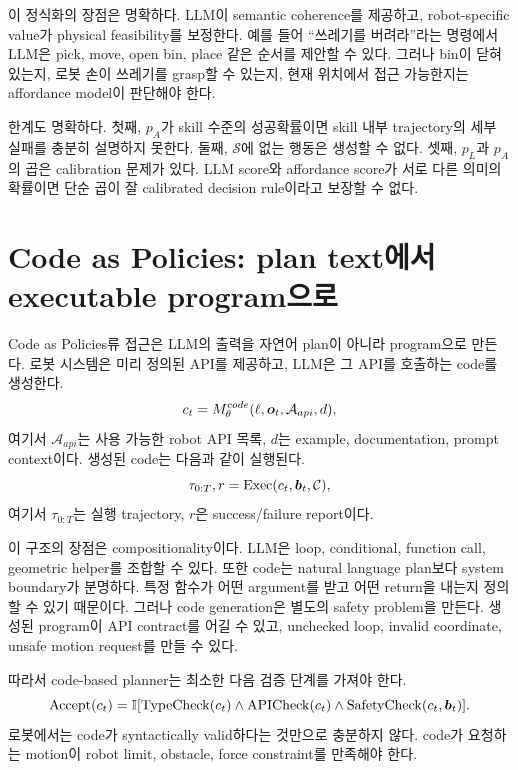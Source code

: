 이 정식화의 장점은 명확하다. LLM이 semantic coherence를 제공하고, robot-specific value가 physical feasibility를 보정한다. 예를 들어 ``쓰레기를 버려라''라는 명령에서 LLM은 pick, move, open bin, place 같은 순서를 제안할 수 있다. 그러나 bin이 닫혀 있는지, 로봇 손이 쓰레기를 grasp할 수 있는지, 현재 위치에서 접근 가능한지는 affordance model이 판단해야 한다.

한계도 명확하다. 첫째, $p_A$가 skill 수준의 성공확률이면 skill 내부 trajectory의 세부 실패를 충분히 설명하지 못한다. 둘째, $\mathcal{S}$에 없는 행동은 생성할 수 없다. 셋째, $p_L$과 $p_A$의 곱은 calibration 문제가 있다. LLM score와 affordance score가 서로 다른 의미의 확률이면 단순 곱이 잘 calibrated decision rule이라고 보장할 수 없다.

\section{Code as Policies: plan text에서 executable program으로}

Code as Policies류 접근은 LLM의 출력을 자연어 plan이 아니라 program으로 만든다. 로봇 시스템은 미리 정의된 API를 제공하고, LLM은 그 API를 호출하는 code를 생성한다.
\begin{equation}
  c_t
  =
  M_{\theta}^{code}(\ell,\bm{o}_t,\mathcal{A}_{api},d),
  \label{eq:code-policy-generation}
\end{equation}
여기서 $\mathcal{A}_{api}$는 사용 가능한 robot API 목록, $d$는 example, documentation, prompt context이다. 생성된 code는 다음과 같이 실행된다.
\begin{equation}
  \tau_{0:T}, r
  =
  \mathrm{Exec}(c_t,\bm{b}_t,\mathcal{C}),
  \label{eq:code-policy-exec}
\end{equation}
여기서 $\tau_{0:T}$는 실행 trajectory, $r$은 success/failure report이다.

이 구조의 장점은 compositionality이다. LLM은 loop, conditional, function call, geometric helper를 조합할 수 있다. 또한 code는 natural language plan보다 system boundary가 분명하다. 특정 함수가 어떤 argument를 받고 어떤 return을 내는지 정의할 수 있기 때문이다. 그러나 code generation은 별도의 safety problem을 만든다. 생성된 program이 API contract를 어길 수 있고, unchecked loop, invalid coordinate, unsafe motion request를 만들 수 있다.

따라서 code-based planner는 최소한 다음 검증 단계를 가져야 한다.
\begin{equation}
  \mathrm{Accept}(c_t)
  =
  \mathbb{I}
  [
    \mathrm{TypeCheck}(c_t)
    \land
    \mathrm{APICheck}(c_t)
    \land
    \mathrm{SafetyCheck}(c_t,\bm{b}_t)
  ].
  \label{eq:code-accept}
\end{equation}
로봇에서는 code가 syntactically valid하다는 것만으로 충분하지 않다. code가 요청하는 motion이 robot limit, obstacle, force constraint를 만족해야 한다.

